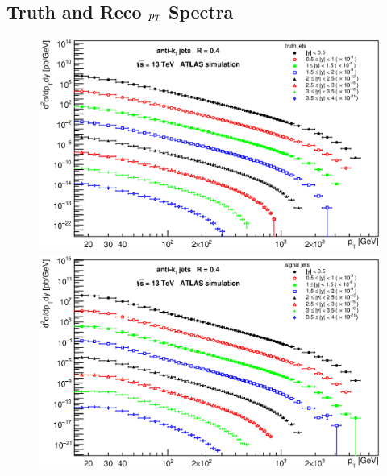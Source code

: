 \begin{appendices}
\section{Truth and Reco $p_{T}$ Spectra}
\label{sec:TruthAndRecoSpectra}
\begin{figure}[H]
  \centering
  \includegraphics[width=\textwidth]{Chapter3/ptTruthAllRapidityBins.eps}
  \includegraphics[width=\textwidth]{Chapter3/ptSignalAllRapidityBins.eps}
\end{figure}



\end{appendices}
